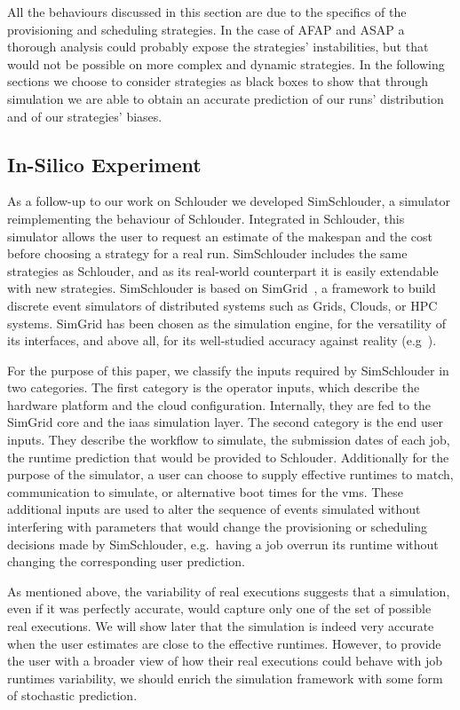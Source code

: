 \documentclass[10pt,conference,compsocconf]{IEEEtran}
\begin{document}
All the behaviours discussed in this section are due to the specifics of the
provisioning and scheduling strategies. In the case of AFAP and ASAP a thorough
analysis could probably expose the strategies' instabilities, but that would not
be possible on more complex and dynamic strategies. In the following sections we
choose to consider strategies as black boxes to show that through simulation 
we are able  to obtain an accurate prediction of our runs' distribution
and of our strategies' biases.




\subsection{In-Silico Experiment}

As a follow-up to our work on Schlouder we developed SimSchlouder, a simulator
reimplementing the behaviour of Schlouder. Integrated in Schlouder, this
simulator allows the user to request an estimate of the makespan and the cost
before choosing a strategy for a real run. SimSchlouder includes the same
strategies as Schlouder, and as its real-world counterpart it is easily
extendable with new strategies. SimSchlouder is based on SimGrid~\cite{simgrid},
a framework to build discrete event simulators of distributed systems such as
Grids, Clouds, or HPC systems. SimGrid has been chosen as the simulation engine,
for the versatility of its interfaces, and above all, for its well-studied
accuracy against reality (e.g~\cite{StanisicTLVM15,VelhoSCL13}).


For the purpose of this paper, we classify the inputs required by SimSchlouder
in two categories. The first category is the operator inputs, which describe the
hardware platform and the cloud configuration. Internally, they are fed to the
SimGrid core and the \ac{iaas} simulation layer. The second category is the end
user inputs. They describe the workflow to simulate, the submission dates of
each job, the runtime prediction that would be provided to Schlouder.
Additionally for the purpose of the simulator, a user can choose to supply
effective runtimes to match, communication to simulate, or alternative boot
times for the \acp{vm}. These additional inputs are used to alter the sequence
of events simulated without interfering with parameters that would change the
provisioning or scheduling decisions made by SimSchlouder, e.g.\ having a job
overrun its runtime without changing the corresponding user prediction.

As mentioned above, the variability of real executions suggests that a simulation,
even if it was  perfectly accurate, would capture only one of the set
of possible real executions. We will show later that  the simulation is indeed
very   accurate  when   the  user   estimates  are   close  to   the  effective
runtimes. However,  to  provide the user  with a broader view  of how
their real executions could behave with job runtimes variability,  we should 
enrich the simulation framework with some form of stochastic prediction.
\end{document}
